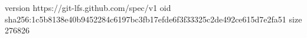 version https://git-lfs.github.com/spec/v1
oid sha256:1c5b8138e40b9452284c6197bc3fb17efde6f3f33325c2de492ce615d7e2fa51
size 276826
